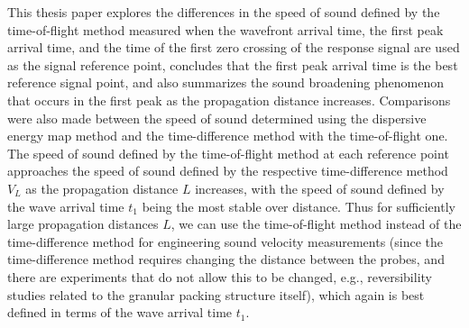 \begin{digest}
    
    This thesis paper explores the differences in the speed of sound defined by the time-of-flight method measured when the wavefront arrival time, the first peak arrival time, and the time of the first zero crossing of the response signal are used as the signal reference point, concludes that the first peak arrival time is the best reference signal point, and also summarizes the sound broadening phenomenon that occurs in the first peak as the propagation distance increases.
    Comparisons were also made between the speed of sound determined using the dispersive energy map method and the time-difference method with the time-of-flight one.
    The speed of sound defined by the time-of-flight method at each reference point approaches the speed of sound defined by the respective time-difference method $V_{L}$ as the propagation distance $L$ increases, with the speed of sound defined by the wave arrival time $t_{1}$ being the most stable over distance. 
    Thus for sufficiently large propagation distances $L$, we can use the time-of-flight method instead of the time-difference method for engineering sound velocity measurements (since the time-difference method requires changing the distance between the probes, and there are experiments that do not allow this to be changed, e.g., reversibility studies related to the granular packing structure itself), which again is best defined in terms of the wave arrival time $t_{1}$.


\end{digest}
